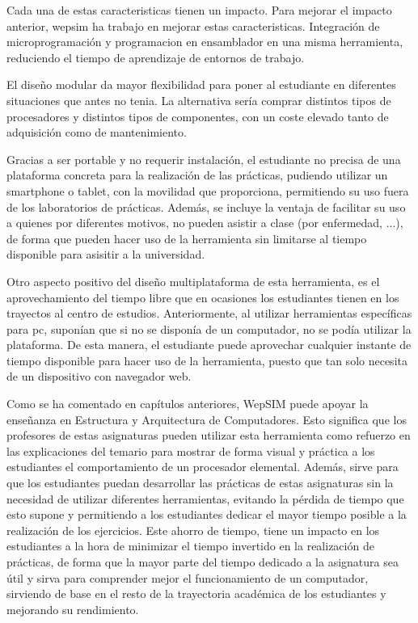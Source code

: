 Cada una de estas caracteristicas tienen un impacto. Para mejorar el impacto anterior, wepsim ha trabajo en mejorar estas caracteristicas. Integración de microprogramación y programacion en ensamblador en una misma herramienta, reduciendo el tiempo de aprendizaje de entornos de trabajo. 

El diseño modular da mayor flexibilidad para poner al estudiante en diferentes situaciones que antes no tenia. La alternativa sería comprar distintos tipos de procesadores y distintos tipos de componentes, con un coste elevado tanto de adquisición como de mantenimiento.

Gracias a ser portable y no requerir instalación, el estudiante no precisa de una plataforma concreta para la realización de  las prácticas, pudiendo utilizar un smartphone o tablet, con la movilidad que proporciona, permitiendo su uso fuera de los laboratorios de prácticas. Además, se incluye la ventaja de facilitar su uso a quienes por diferentes motivos, no pueden asistir a clase (por enfermedad, ...), de forma que pueden hacer uso de la herramienta sin limitarse al tiempo disponible para asisitir a la universidad.

Otro aspecto positivo del diseño multiplataforma de esta herramienta, es el aprovechamiento del tiempo libre que en ocasiones los estudiantes tienen en los trayectos al centro de estudios. Anteriormente, al utilizar herramientas específicas para pc, suponían que si no se disponía de un computador, no se podía utilizar la plataforma. De esta manera, el estudiante puede aprovechar cualquier instante de tiempo disponible para hacer uso de la herramienta, puesto que tan solo necesita de un dispositivo con navegador web.



Como se ha comentado en capítulos anteriores, WepSIM puede apoyar la enseñanza en Estructura y Arquitectura de Computadores. Esto significa que los profesores de estas asignaturas pueden utilizar esta herramienta como refuerzo en las explicaciones del temario para mostrar de forma visual y práctica a los estudiantes el comportamiento de un procesador elemental. Además, sirve para que los estudiantes puedan desarrollar las prácticas de estas asignaturas sin la necesidad de utilizar diferentes herramientas, evitando la pérdida de tiempo que esto supone y permitiendo a los estudiantes dedicar el mayor tiempo posible a la realización de los ejercicios. Este ahorro de tiempo, tiene un impacto en los estudiantes a la hora de minimizar el tiempo invertido en la realización de prácticas, de forma que la mayor parte del tiempo dedicado a la asignatura sea útil y sirva para comprender mejor el funcionamiento de un computador, sirviendo de base en el resto de la trayectoria académica de los estudiantes y mejorando su rendimiento.

